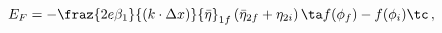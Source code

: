 \begin{equation}
E_F=-\fraz{2 e\beta_1}{(k\cdot\Delta x)} {\bar\eta}_{1
f}\,({\bar\eta}_{2 f}+\eta_{2 i})\,\ta f(\phi_f) -
 f(\phi_i)\tc\,,
\end{equation}

